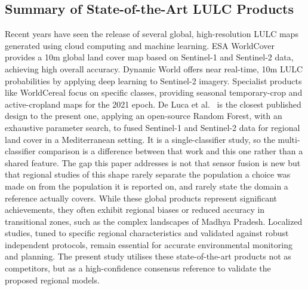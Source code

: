 \documentclass[conference]{IEEEtran}
\begin{document}
\subsection{Summary of State-of-the-Art LULC Products}
Recent years have seen the release of several global, high-resolution LULC maps generated using cloud computing and machine learning. ESA WorldCover \cite{r14} provides a 10m global land cover map based on Sentinel-1 and Sentinel-2 data, achieving high overall accuracy. Dynamic World \cite{r15} offers near real-time, 10m LULC probabilities by applying deep learning to Sentinel-2 imagery. Specialist products like WorldCereal \cite{r16} focus on specific classes, providing seasonal temporary-crop and active-cropland maps for the 2021 epoch. De Luca et al.\ \cite{r33} is the closest published design to the present one, applying an open-source Random Forest, with an exhaustive parameter search, to fused Sentinel-1 and Sentinel-2 data for regional land cover in a Mediterranean setting. It is a single-classifier study, so the multi-classifier comparison is a difference between that work and this one rather than a shared feature. The gap this paper addresses is not that sensor fusion is new but that regional studies of this shape rarely separate the population a choice was made on from the population it is reported on, and rarely state the domain a reference actually covers.
While these global products represent significant achievements, they often exhibit regional biases or reduced accuracy in transitional zones, such as the complex landscapes of Madhya Pradesh. Localized studies, tuned to specific regional characteristics and validated against robust independent protocols, remain essential for accurate environmental monitoring and planning. The present study utilises these state-of-the-art products not as competitors, but as a high-confidence consensus reference to validate the proposed regional models.
\end{document}
